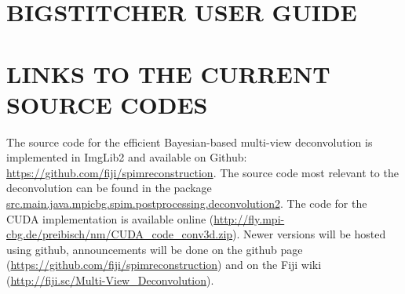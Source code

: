 \documentclass[]{spie}  %
\begin{document}

\pagebreak



\section{BIGSTITCHER USER GUIDE}
\label{sec:documentation}



\pagebreak

\section{LINKS TO THE CURRENT SOURCE CODES}
\label{sec:currentcode}

The source code for the efficient Bayesian-based multi-view deconvolution is implemented in ImgLib2\cite{PietzschAl12} and available on Github: \url{https://github.com/fiji/spimreconstruction}. The source code most relevant to the deconvolution can be found in the package \url{src.main.java.mpicbg.spim.postprocessing.deconvolution2}. The code for the CUDA implementation is available online (\url{http://fly.mpi-cbg.de/preibisch/nm/CUDA_code_conv3d.zip}). Newer versions will be hosted using github, announcements will be done on the github page (\url{https://github.com/fiji/spimreconstruction}) and on the Fiji wiki (\url{http://fiji.sc/Multi-View_Deconvolution}).
\end{document}
